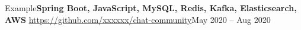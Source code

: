 \begin{rSubsection}{Example}{\textbf{Spring Boot, JavaScript, MySQL, Redis, Kafka, Elasticsearch, AWS}}{{\Large\href{https://github.com/xxxxxx/chat-community}\faGithub}  \href{https://github.com/xxxxxx/chat-community}{https://github.com/xxxxxx/chat-community}}{May 2020 -- Aug 2020}
\item 
\item 
\item 
\end{rSubsection}